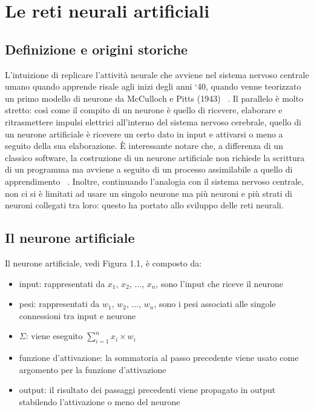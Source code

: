 \documentclass[12pt]{report}
\begin{document}
\tableofcontents

\chapter{Le reti neurali artificiali}

\linespread{1.4}\selectfont
\section{Definizione e origini storiche}
L’intuizione di replicare l’attività neurale che avviene nel sistema nervoso centrale umano quando apprende risale agli inizi degli anni ‘40, quando venne teorizzato un primo modello di neurone da McCulloch e Pitts (1943) ~\cite{McCulloch}. Il parallelo è molto stretto: così come il compito di un neurone è quello di ricevere, elaborare e ritrasmettere impulsi elettrici all’interno del sistema nervoso cerebrale, quello di un neurone artificiale è ricevere un certo dato in input e attivarsi o meno a seguito della sua elaborazione.
È interessante notare che, a differenza di un classico software, la costruzione di un neurone artificiale non richiede la scrittura di un programma ma avviene a seguito di un processo assimilabile a quello di apprendimento ~\cite{Perceptron}. Inoltre, continuando l'analogia con il sistema nervoso centrale, non ci si è limitati ad usare un singolo neurone ma più neuroni e più strati di neuroni collegati tra loro: questo ha portato allo sviluppo delle reti neurali.

\section{Il neurone artificiale}
Il neurone artificiale, vedi Figura 1.1, è composto da:
\begin{itemize}
\item{input}: rappresentati da $x_1$, $x_2$, $\dots$, $x_n$, sono l'input che riceve il neurone
\item{pesi}: rappresentati da $w_1$, $w_2$, $...$, $w_n$, sono i pesi associati alle singole connessioni tra input e neurone
\item{$\Sigma$}: viene eseguito $\displaystyle{\sum_{i=1}^n x_i \times w_i}$
\item{funzione d'attivazione}: la sommatoria al passo precedente viene usato come argomento per la funzione d'attivazione
\item{output}: il risultato dei passaggi precedenti viene propagato in output stabilendo l'attivazione o meno del neurone
\end{itemize}
\end{document}
